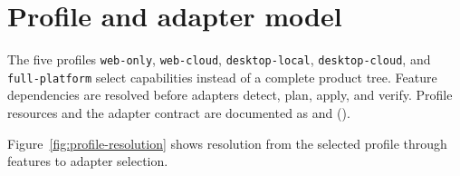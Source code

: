 \section{Profile and adapter model}
\label{chap:profile-adapter-model}

The five profiles \texttt{web-only}, \texttt{web-cloud}, \texttt{desktop-local},
\texttt{desktop-cloud}, and \texttt{full-platform} select capabilities instead of a
complete product tree. Feature dependencies are resolved before adapters detect, plan,
apply, and verify. Profile resources and the adapter contract are documented as
\Implemented{} and \Verified{} ().

Figure~\ref{fig:profile-resolution} shows resolution from the selected profile
through features to adapter selection.

